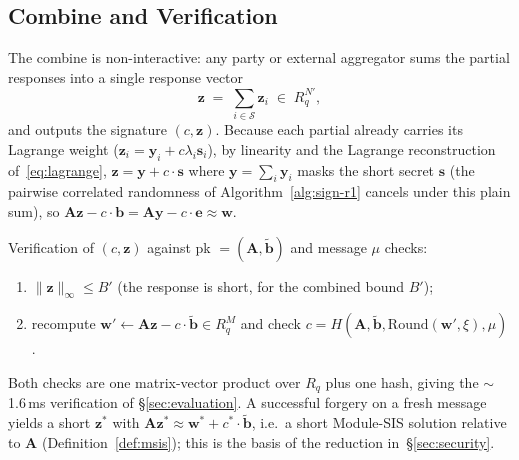 \subsection{Combine and Verification}

The combine is non-interactive: any party or external aggregator sums the partial
responses into a single response vector
\[
\mathbf{z} \;=\; \sum_{i \in \mathcal{S}} \mathbf{z}_i \;\in\; R_q^{N'} ,
\]
and outputs the signature $(c, \mathbf{z})$. Because each partial already carries its
Lagrange weight ($\mathbf{z}_i = \mathbf{y}_i + c \lambda_i \mathbf{s}_i$), by linearity
and the Lagrange reconstruction of~\eqref{eq:lagrange},
$\mathbf{z} = \mathbf{y} + c \cdot \mathbf{s}$ where
$\mathbf{y} = \sum_{i} \mathbf{y}_i$ masks the short secret $\mathbf{s}$
(the pairwise correlated randomness of Algorithm~\ref{alg:sign-r1} cancels under this
plain sum), so
$\mathbf{A}\mathbf{z} - c \cdot \mathbf{b} = \mathbf{A}\mathbf{y} - c \cdot \mathbf{e} \approx \mathbf{w}$.

Verification of $(c, \mathbf{z})$ against pk $= (\mathbf{A}, \tilde{\mathbf{b}})$ and
message $\mu$ checks:
\begin{enumerate}[nosep]
\item $\|\mathbf{z}\|_\infty \leq B'$ (the response is short, for the combined bound $B'$);
\item recompute $\mathbf{w}' \gets \mathbf{A}\mathbf{z} - c \cdot \tilde{\mathbf{b}} \in R_q^{M}$ and check $c = H(\mathbf{A}, \tilde{\mathbf{b}}, \mathrm{Round}(\mathbf{w}', \xi), \mu)$.
\end{enumerate}
Both checks are one matrix-vector product over $R_q$ plus one hash, giving the
$\sim$1.6\,ms verification of \S\ref{sec:evaluation}. A successful forgery on a fresh
message yields a short $\mathbf{z}^*$ with $\mathbf{A}\mathbf{z}^* \approx \mathbf{w}^* + c^* \cdot \tilde{\mathbf{b}}$,
i.e.\ a short Module-SIS solution relative to $\mathbf{A}$ (Definition~\ref{def:msis});
this is the basis of the reduction in~\S\ref{sec:security}.

